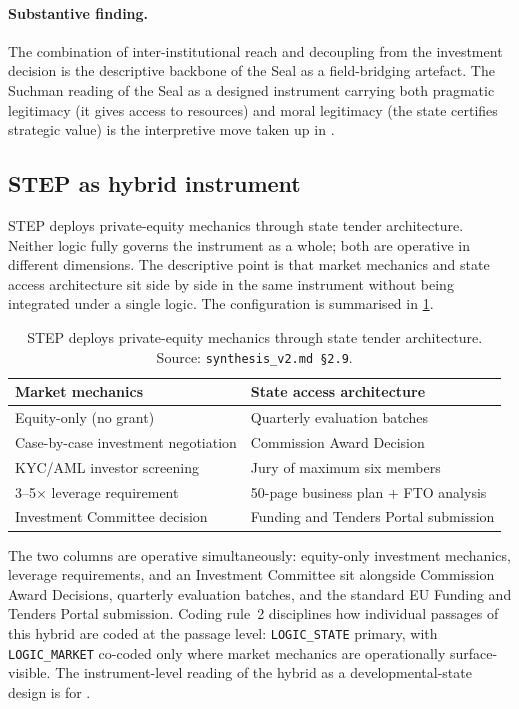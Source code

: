 \paragraph{Substantive finding.}
The combination of inter-institutional reach and decoupling from the
investment decision is the descriptive backbone of the Seal as a
field-bridging artefact. The Suchman reading of the Seal as a
designed instrument carrying both pragmatic legitimacy (it gives
access to resources) and moral legitimacy (the state certifies
strategic value) is the interpretive move taken up in
.

\subsection{STEP as hybrid instrument}
\label{sec:res-step-hybrid}

STEP deploys private-equity mechanics through state tender
architecture. Neither logic fully governs the instrument as a whole;
both are operative in different dimensions. The descriptive point is
that market mechanics and state access architecture sit side by side
in the same instrument without being integrated under a single
logic. The configuration is summarised in
\cref{tab:res-step-hybrid}.

\begin{table}[H]
\centering
\caption[STEP as hybrid instrument]{STEP deploys private-equity
mechanics through state tender architecture. Source:
\texttt{synthesis\_v2.md~\S2.9}.}
\label{tab:res-step-hybrid}
\begin{tabularx}{\textwidth}{@{} X X @{}}
\toprule
\textbf{Market mechanics} & \textbf{State access architecture} \\
\midrule
Equity-only (no grant)
  & Quarterly evaluation batches \\
Case-by-case investment negotiation
  & Commission Award Decision \\
KYC/AML investor screening
  & Jury of maximum six members \\
3--5$\times$ leverage requirement
  & 50-page business plan + FTO analysis \\
Investment Committee decision
  & Funding and Tenders Portal submission \\
\bottomrule
\end{tabularx}
\end{table}

The two columns are operative simultaneously: equity-only investment
mechanics, leverage requirements, and an Investment Committee sit
alongside Commission Award Decisions, quarterly evaluation batches,
and the standard EU Funding and Tenders Portal submission. Coding
rule~2 disciplines how individual passages of this hybrid are coded
at the passage level: \texttt{LOGIC\_STATE} primary, with
\texttt{LOGIC\_MARKET} co-coded only where market mechanics are
operationally surface-visible. The instrument-level reading of the
hybrid as a developmental-state design is for .

